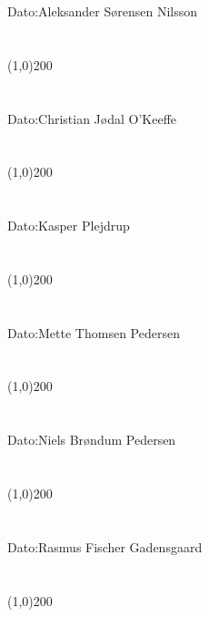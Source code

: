 Dato:\indent\indent Aleksander Sørensen Nilsson\\\\\\
\indent\line(1,0){200}\\\\\\
\indent Dato:\indent\indent Christian Jødal O'Keeffe\\\\\\
\indent\line(1,0){200}\\\\\\
\indent Dato:\indent\indent  Kasper Plejdrup\\\\\\
\indent\line(1,0){200}\\\\\\
\indent Dato:\indent\indent  Mette Thomsen Pedersen\\\\\\
\indent\line(1,0){200}\\\\\\
\indent Dato:\indent\indent  Niels Brøndum Pedersen\\\\\\
\indent\line(1,0){200}\\\\\\
\indent Dato:\indent\indent  Rasmus Fischer Gadensgaard\\\\\\
\indent\line(1,0){200}\\\\\\
